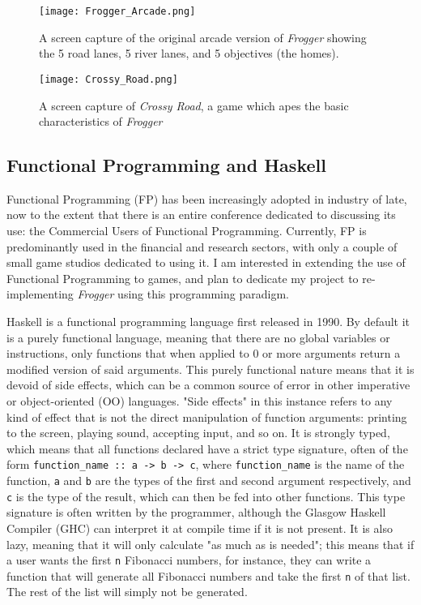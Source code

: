 \documentclass[12pt, a4paper]{report}
\begin{document}
\begin{figure}[ht]
  \centering
  \caption{A screen capture of the original arcade version of \textit{Frogger} showing the 5 road lanes, 5 river lanes, and 5 objectives (the homes).}
  \texttt{[image: Frogger\_Arcade.png]}
\end{figure}
\begin{figure}[ht]
  \centering
  \caption{A screen capture of \textit{Crossy Road}, a game which apes the basic characteristics of \textit{Frogger}}
  \texttt{[image: Crossy\_Road.png]}
\end{figure}

\subsection{Functional Programming and Haskell}
Functional Programming (FP) has been increasingly adopted in industry of late, now to the extent that there is an entire conference dedicated to discussing its use: the Commercial Users of Functional Programming\cite{cufp}.
Currently, FP is predominantly used in the financial and research sectors, with only a couple of small game studios dedicated to using it.
I am interested in extending the use of Functional Programming to games, and plan to dedicate my project to re-implementing \textit{Frogger} using this programming paradigm.

\par

Haskell is a functional programming language first released in 1990.
By default it is a purely functional language, meaning that there are no global variables or instructions, only functions that when applied to 0 or more arguments return a modified version of said arguments.
This purely functional nature means that it is devoid of side effects, which can be a common source of error in other imperative or object-oriented (OO) languages.
"Side effects" in this instance refers to any kind of effect that is not the direct manipulation of function arguments: printing to the screen, playing sound, accepting input, and so on.
It is strongly typed\cite{haskellsite}, which means that all functions declared have a strict type signature, often of the form \verb|function_name :: a -> b -> c|, where \verb|function_name| is the name of the function, \verb|a| and \verb|b| are the types of the first and second argument respectively, and \verb|c| is the type of the result, which can then be fed into other functions.
This type signature is often written by the programmer, although the Glasgow Haskell Compiler (GHC) can interpret it at compile time if it is not present.
It is also lazy\cite{haskellsite}, meaning that it will only calculate "as much as is needed"; this means that if a user wants the first \verb|n| Fibonacci numbers, for instance, they can write a function that will generate all Fibonacci numbers and take the first \verb|n| of that list.
The rest of the list will simply not be generated.
\end{document}

